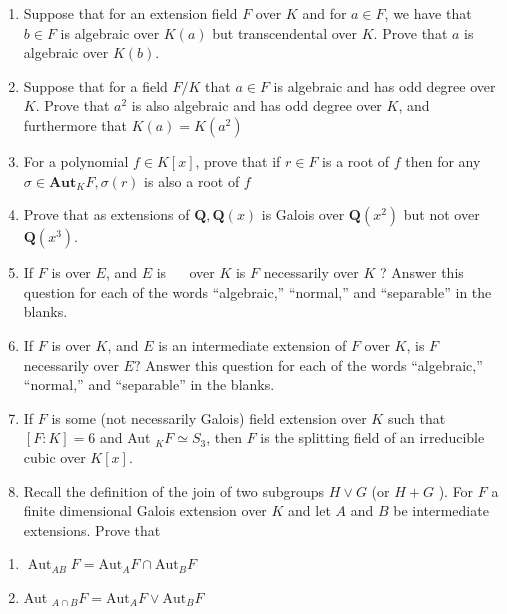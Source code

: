 \begin{enumerate}
\def\labelenumi{\arabic{enumi}.}
\tightlist
\item
  Suppose that for an extension field \(F\) over \(K\) and for
  \(a \in F\), we have that \(b \in F\) is algebraic over \(K(a)\) but
  transcendental over \(K\). Prove that \(a\) is algebraic over
  \(K(b)\).
\item
  Suppose that for a field \(F / K\) that \(a \in F\) is algebraic and
  has odd degree over \(K\). Prove that \(a^{2}\) is also algebraic and
  has odd degree over \(K\), and furthermore that
  \(K(a)=K\left(a^{2}\right)\)
\item
  For a polynomial \(f \in K[x]\), prove that if \(r \in F\) is a root
  of \(f\) then for any \(\sigma \in \mathbf{A u t}_{K} F, \sigma(r)\)
  is also a root of \(f\)
\item
  Prove that as extensions of \(\boldsymbol{Q}, \boldsymbol{Q}(x)\) is
  Galois over \(\boldsymbol{Q}\left(x^{2}\right)\) but not over
  \(\boldsymbol{Q}\left(x^{3}\right)\).
\item
  If \(F\) is over \(E\), and \(E\) is \(\quad\) over \(K\) is \(F\)
  necessarily over \(K\) ? Answer this question for each of the words
  ``algebraic,'' ``normal,'' and ``separable'' in the blanks.
\item
  If \(F\) is over \(K\), and \(E\) is an intermediate extension of
  \(F\) over \(K\), is \(F\) necessarily over \(E ?\) Answer this
  question for each of the words ``algebraic,'' ``normal,'' and
  ``separable'' in the blanks.
\item
  If \(F\) is some (not necessarily Galois) field extension over \(K\)
  such that \([F: K]=6\) and Aut \(_{K} F \simeq S_{3}\), then \(F\) is
  the splitting field of an irreducible cubic over \(K[x]\).
\item
  Recall the definition of the join of two subgroups \(H \vee G\) (or
  \(H+G\) ). For \(F\) a finite dimensional Galois extension over \(K\)
  and let \(A\) and \(B\) be intermediate extensions. Prove that
\end{enumerate}

\begin{enumerate}
\def\labelenumi{\alph{enumi}.}
\tightlist
\item
  \(\operatorname{Aut}_{A B} F=\mathrm{Aut}_{A} F \cap \mathrm{Aut}_{B} F\)
\item
  Aut \(_{A \cap B} F=\mathrm{Aut}_{A} F \vee \mathrm{Aut}_{B} F\)
\end{enumerate}

